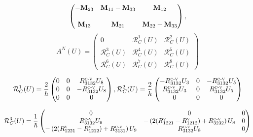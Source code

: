 \documentclass[a4paper]{article}
\begin{document}
\begin{itemize}
\begin{equation*}
\begin{pmatrix}
-\textbf{M}_{23}& \textbf{M}_{11} - \textbf{M}_{33} &  \textbf{M}_{12}\\ 
\vspace{0.0025cm} & \vspace{0.0025cm} & \vspace{0.0025cm}\\
 \textbf{M}_{13}& \textbf{M}_{21}& \textbf{M}_{22} - \textbf{M}_{33}
\end{pmatrix},
\end{equation*} 
\begin{equation*}\label{matrice AN}
A^{N}(U)=
\begin{pmatrix}
0 & \mathcal{R}^{1}_{C}(U) & \mathcal{R}^{2}_{C}(U)\\
\mathcal{R}^{3}_{C}(U) & \mathcal{R}^{4}_{C}(U) & \mathcal{R}^{5}_{C}(U) \\
\mathcal{R}^{6}_{C}(U) & \mathcal{R}^{7}_{C}(U)&\mathcal{R}^{8}_{C}(U)
\end{pmatrix}
\end{equation*}

\[\mathcal{R}^{1}_{C}(U) = \dfrac{2}{\hbar}
\begin{pmatrix}
0 & 0 & R^{\textsc{c-v}}_{3132}U_{8}\\
0 & 0 & -R^{\textsc{c-v}}_{3132}U_{8}\\
            0 &                               0 & 0
\end{pmatrix},
\mathcal{R}^{2}_{C}(U) = \dfrac{2}{\hbar}
\begin{pmatrix}
-R^{\textsc{c-v}}_{3132}U_{3} & 0 & -R^{\textsc{c-v}}_{3132}U_{5}\\
R^{\textsc{c-v}}_{3132}U_{3} & 0& R^{\textsc{c-v}}_{3132}U_{5}\\
            0 &                               0 & 0
\end{pmatrix}\]

\[\mathcal{R}^{3}_{C}(U)= \dfrac{1}{\hbar}
\begin{pmatrix}
0 & 0 & 0\\
R^{\textsc{c-v}}_{3132}U_{9} &
-\left(2(R^{\textsc{v}}_{1221}-R^{\textsc{v}}_{1212})+R^{\textsc{c-v}}_{3232}\right) U_{8} & 0 \\
-\left(2(R^{\textsc{v}}_{1221}-R^{\textsc{v}}_{1212})+R^{\textsc{c-v}}_{3131}\right)U_{9} & R^{\textsc{c-v}}_{3132} U_{8} & 0
\end{pmatrix}\]


\end{itemize}
\end{document}
